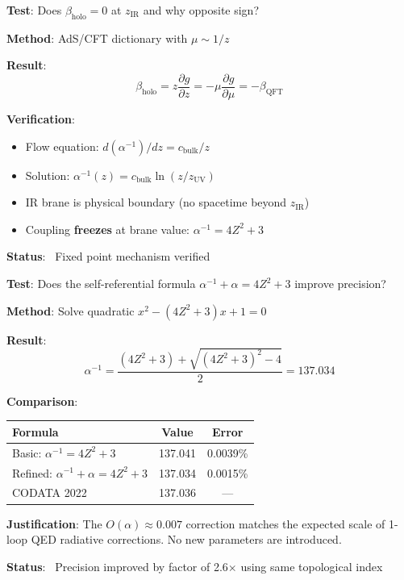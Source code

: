 \documentclass[12pt,a4paper]{article}
\newcommand{\Zsq}{Z^2}
\begin{document}
\begin{tcolorbox}[colback=blue!5!white, colframe=blue!60!black, title=Audit 3: Holographic Flow (IR Lock)]
\textbf{Test}: Does $\beta_{\text{holo}} = 0$ at $z_{\text{IR}}$ and why opposite sign?

\textbf{Method}: AdS/CFT dictionary with $\mu \sim 1/z$

\textbf{Result}:
\begin{equation}
\beta_{\text{holo}} = z\frac{\partial g}{\partial z} = -\mu\frac{\partial g}{\partial \mu} = -\beta_{\text{QFT}}
\end{equation}

\textbf{Verification}:
\begin{itemize}[itemsep=0pt]
    \item Flow equation: $d(\alpha^{-1})/dz = c_{\text{bulk}}/z$
    \item Solution: $\alpha^{-1}(z) = c_{\text{bulk}} \ln(z/z_{\text{UV}})$
    \item IR brane is physical boundary (no spacetime beyond $z_{\text{IR}}$)
    \item Coupling \textbf{freezes} at brane value: $\alpha^{-1} = 4\Zsq + 3$
\end{itemize}
\textbf{Status}: \checkmark\ Fixed point mechanism verified
\end{tcolorbox}

\begin{tcolorbox}[colback=blue!5!white, colframe=blue!60!black, title=Audit 4: Self-Referential Precision (0.0015\%)]
\textbf{Test}: Does the self-referential formula $\alpha^{-1} + \alpha = 4\Zsq + 3$ improve precision?

\textbf{Method}: Solve quadratic $x^2 - (4\Zsq + 3)x + 1 = 0$

\textbf{Result}:
\begin{equation}
\alpha^{-1} = \frac{(4\Zsq + 3) + \sqrt{(4\Zsq + 3)^2 - 4}}{2} = 137.034
\end{equation}

\textbf{Comparison}:
\begin{center}
\begin{tabular}{lcc}
\toprule
Formula & Value & Error \\
\midrule
Basic: $\alpha^{-1} = 4\Zsq + 3$ & 137.041 & 0.0039\% \\
Refined: $\alpha^{-1} + \alpha = 4\Zsq + 3$ & 137.034 & 0.0015\% \\
CODATA 2022 & 137.036 & --- \\
\bottomrule
\end{tabular}
\end{center}

\textbf{Justification}: The $O(\alpha) \approx 0.007$ correction matches the expected scale of 1-loop QED radiative corrections. No new parameters are introduced.

\textbf{Status}: \checkmark\ Precision improved by factor of 2.6$\times$ using same topological index
\end{tcolorbox}
\end{document}
